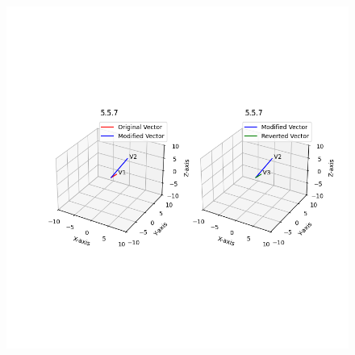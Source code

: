 \documentclass[journal,12pt,onecolumn]{IEEEtran}
\theoremstyle{remark}
\begin{document}
\begin{figure}[H]
    \centering
    \includegraphics{figs/plot.png}
    \caption*{}
    \label{fig:plot}
\end{figure}
\end{document}
